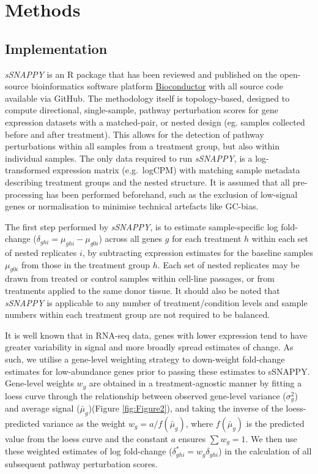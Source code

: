 \documentclass[9pt,a4paper,]{extarticle}
\begin{document}
\hypertarget{methods}{%
\section{Methods}\label{methods}}

\hypertarget{implementation}{%
\subsection{Implementation}\label{implementation}}

\emph{sSNAPPY} is an R package that has been reviewed and published on the open-source bioinformatics software platform \href{https://bioconductor.org/packages/release/bioc/html/*sSNAPPY*.html}{Bioconductor} with all source code available via GitHub.
The methodology itself is topology-based, designed to compute directional, single-sample, pathway perturbation scores for gene expression datasets with a matched-pair, or nested design (eg. samples collected before and after treatment).
This allows for the detection of pathway perturbations within all samples from a treatment group, but also within individual samples.
The only data required to run \emph{sSNAPPY}, is a log-transformed expression matrix (e.g.~logCPM) with matching sample metadata describing treatment groups and the nested structure.
It is assumed that all pre-processing has been performed beforehand, such as the exclusion of low-signal genes or normalisation to minimise technical artefacts like GC-bias.

The first step performed by \emph{sSNAPPY}, is to estimate sample-specific log fold-change (\(\delta_{ghi} = \mu_{ghi} - \mu_{g0i}\)) across all genes \(g\) for each treatment \(h\) within each set of nested replicates \(i\), by subtracting expression estimates for the baseline samples \(\mu_{g0i}\) from those in the treatment group \(h\).
Each set of nested replicates may be drawn from treated or control samples within cell-line passages, or from treatments applied to the same donor tissue.
It should also be noted that \emph{sSNAPPY} is applicable to any number of treatment/condition levels and sample numbers within each treatment group are not required to be balanced.

It is well known that in RNA-seq data, genes with lower expression tend to have greater variability in signal and more broadly spread estimates of change\citep{Law2014}.
As such, we utilise a gene-level weighting strategy to down-weight fold-change estimates for low-abundance genes prior to passing these estimates to sSNAPPY.
Gene-level weights \(w_g\) are obtained in a treatment-agnostic manner by fitting a loess curve through the relationship between observed gene-level variance (\(\sigma^2_g\)) and average signal (\(\bar\mu_{g}\))(Figure \ref{fig:Figure2}), and taking the inverse of the loess-predicted variance as the weight \(w_g = a / f(\bar\mu_{g})\), where \(f(\bar\mu_{g})\) is the predicted value from the loess curve and the constant \(a\) ensures \(\sum w_g = 1\).
We then use these weighted estimates of log fold-change (\(\delta_{ghi}^* = w_g\delta_{ghi}\)) in the calculation of all subsequent pathway perturbation scores.
\end{document}
